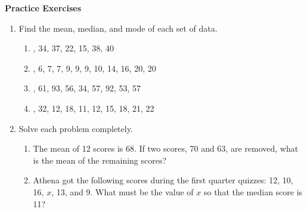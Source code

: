 \textbf{Practice Exercises}

\vspce

\begin{enumerate}[label = \Alph*. ]
\item \hspce Find the mean, median, and mode  of each set of data.
\begin{enumerate}[label = \arabic*. ]
\item {}, 34, 37, 22, 15, 38, 40
\item {}, 6, 7, 7, 9, 9, 9, 10, 14, 16, 20, 20
\item {}, 61, 93, 56, 34, 57, 92, 53, 57
\item {}, 32, 12, 18, 11, 12, 15, 18, 21, 22

\end{enumerate}  

\item \hspce Solve each problem completely. 
\begin{enumerate}[label = \arabic*. ]
\item The mean of 12 scores is 68. If two scores, 70 and 63, are removed, what is the mean of the remaining scores?
\item Athena got the following scores during the first quarter quizzes: 12, 10, 16, $x$, 13, and 9. What must be the value of $x$ so that the median score is 11?

\end{enumerate}   

\end{enumerate} 